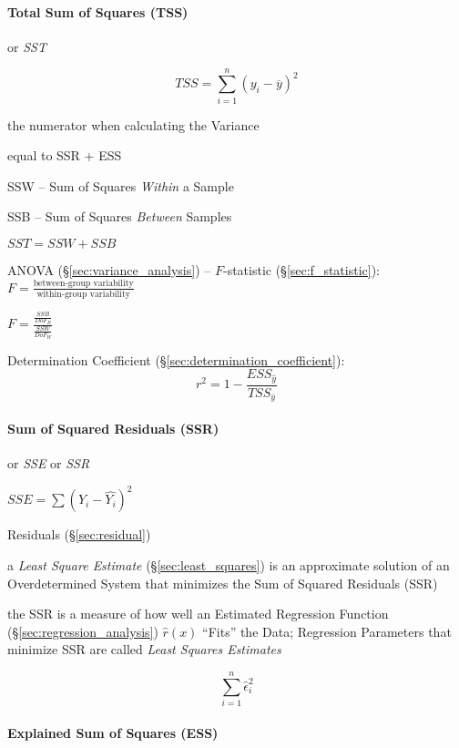 \paragraph{Total Sum of Squares (TSS)}\label{sec:tss}\hfill

or \emph{SST}

\[
  TSS = \sum_{i=1}^n (y_i - \overline{y})^2
\]

the numerator when calculating the Variance

equal to SSR + ESS

SSW -- Sum of Squares \emph{Within} a Sample

SSB -- Sum of Squares \emph{Between} Samples

$SST = SSW + SSB$

ANOVA (\S\ref{sec:variance_analysis}) --
$F$-statistic (\S\ref{sec:f_statistic}):
$F = \frac{\text{between-group variability}}{\text{within-group variability}}$

$F = \frac{\frac{SSB}{DoF_B}}{\frac{SSW}{DoF_W}}$

Determination Coefficient (\S\ref{sec:determination_coefficient}):
\[
  r^2 = 1 - \frac{
    ESS_{\hat{y}}
  }{
    TSS_{\overline{y}}
  }
\]



\paragraph{Sum of Squared Residuals (SSR)}\label{sec:ssr}\hfill

or \emph{SSE} or \emph{SSR}

$SSE = \sum(Y_i - \hat{Y_i})^2$

Residuals (\S\ref{sec:residual})

\fist a \emph{Least Square Estimate} (\S\ref{sec:least_squares}) is an
approximate solution of an Overdetermined System that minimizes the Sum of
Squared Residuals (SSR)

the SSR is a measure of how well an Estimated Regression Function
(\S\ref{sec:regression_analysis}) $\hat{r}(x)$ ``Fits'' the Data; Regression
Parameters that minimize SSR are called \emph{Least Squares Estimates}

\[
  \sum_{i=1}^n \hat{\epsilon}_i^2
\]



\paragraph{Explained Sum of Squares (ESS)}\label{sec:ess}\hfill

